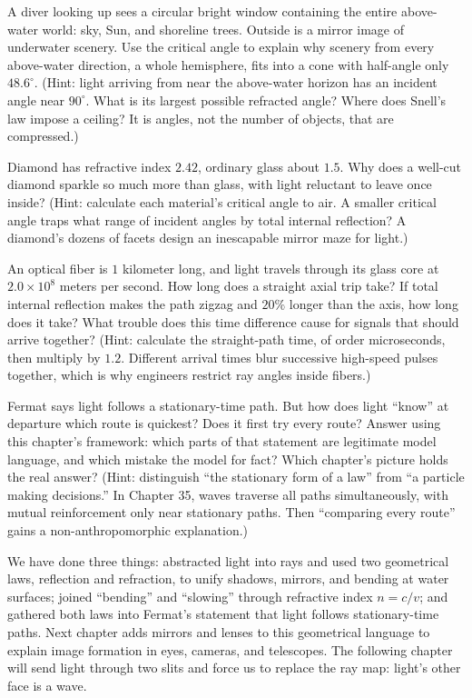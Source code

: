 \begin{puzzles}
\item A diver looking up sees a circular bright window containing the entire above-water world: sky, Sun, and shoreline trees. Outside is a mirror image of underwater scenery. Use the critical angle to explain why scenery from every above-water direction, a whole hemisphere, fits into a cone with half-angle only \(48.6^\circ\). (Hint: light arriving from near the above-water horizon has an incident angle near \(90^\circ\). What is its largest possible refracted angle? Where does Snell's law impose a ceiling? It is angles, not the number of objects, that are compressed.)
\item Diamond has refractive index \(2.42\), ordinary glass about \(1.5\). Why does a well-cut diamond sparkle so much more than glass, with light reluctant to leave once inside? (Hint: calculate each material's critical angle to air. A smaller critical angle traps what range of incident angles by total internal reflection? A diamond's dozens of facets design an inescapable mirror maze for light.)
\item An optical fiber is \(1\) kilometer long, and light travels through its glass core at \(2.0\times10^8\) meters per second. How long does a straight axial trip take? If total internal reflection makes the path zigzag and \(20\%\) longer than the axis, how long does it take? What trouble does this time difference cause for signals that should arrive together? (Hint: calculate the straight-path time, of order microseconds, then multiply by \(1.2\). Different arrival times blur successive high-speed pulses together, which is why engineers restrict ray angles inside fibers.)
\item Fermat says light follows a stationary-time path. But how does light ``know'' at departure which route is quickest? Does it first try every route? Answer using this chapter's framework: which parts of that statement are legitimate model language, and which mistake the model for fact? Which chapter's picture holds the real answer? (Hint: distinguish ``the stationary form of a law'' from ``a particle making decisions.'' In Chapter 35, waves traverse all paths simultaneously, with mutual reinforcement only near stationary paths. Then ``comparing every route'' gains a non-anthropomorphic explanation.)
\end{puzzles}

\begin{mainline}
We have done three things: abstracted light into rays and used two geometrical laws, reflection and refraction, to unify shadows, mirrors, and bending at water surfaces; joined ``bending'' and ``slowing'' through refractive index \(n=c/v\); and gathered both laws into Fermat's statement that light follows stationary-time paths. Next chapter adds mirrors and lenses to this geometrical language to explain image formation in eyes, cameras, and telescopes. The following chapter will send light through two slits and force us to replace the ray map: light's other face is a wave.
\end{mainline}
